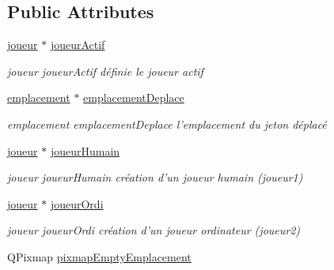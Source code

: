 \subsection*{Public Attributes}
\begin{DoxyCompactItemize}
\item 
\hypertarget{classMainWindow_a267d43ab6a839ee5f91869efa84cf271}{\hyperlink{classjoueur}{joueur} $\ast$ \hyperlink{classMainWindow_a267d43ab6a839ee5f91869efa84cf271}{joueur\-Actif}}\label{classMainWindow_a267d43ab6a839ee5f91869efa84cf271}

\begin{DoxyCompactList}\small\item\em joueur joueur\-Actif  définie le joueur actif \end{DoxyCompactList}\item 
\hypertarget{classMainWindow_ad334c5c1d3c58a97eb424324b3c6225e}{\hyperlink{classemplacement}{emplacement} $\ast$ \hyperlink{classMainWindow_ad334c5c1d3c58a97eb424324b3c6225e}{emplacement\-Deplace}}\label{classMainWindow_ad334c5c1d3c58a97eb424324b3c6225e}

\begin{DoxyCompactList}\small\item\em emplacement emplacement\-Deplace  l'emplacement du jeton déplacé \end{DoxyCompactList}\item 
\hypertarget{classMainWindow_a5d1e13ecdb63fa88e114565df70613aa}{\hyperlink{classjoueur}{joueur} $\ast$ \hyperlink{classMainWindow_a5d1e13ecdb63fa88e114565df70613aa}{joueur\-Humain}}\label{classMainWindow_a5d1e13ecdb63fa88e114565df70613aa}

\begin{DoxyCompactList}\small\item\em joueur joueur\-Humain  création d'un joueur humain (joueur1) \end{DoxyCompactList}\item 
\hypertarget{classMainWindow_a7ce2a641dae02c27242c9bca5ec2174f}{\hyperlink{classjoueur}{joueur} $\ast$ \hyperlink{classMainWindow_a7ce2a641dae02c27242c9bca5ec2174f}{joueur\-Ordi}}\label{classMainWindow_a7ce2a641dae02c27242c9bca5ec2174f}

\begin{DoxyCompactList}\small\item\em joueur joueur\-Ordi  création d'un joueur ordinateur (joueur2) \end{DoxyCompactList}\item 
\hypertarget{classMainWindow_a40ca81795033b7d295527bc860f716cf}{Q\-Pixmap \hyperlink{classMainWindow_a40ca81795033b7d295527bc860f716cf}{pixmap\-Empty\-Emplacement}}\label{classMainWindow_a40ca81795033b7d295527bc860f716cf}


\end{DoxyCompactItemize}
